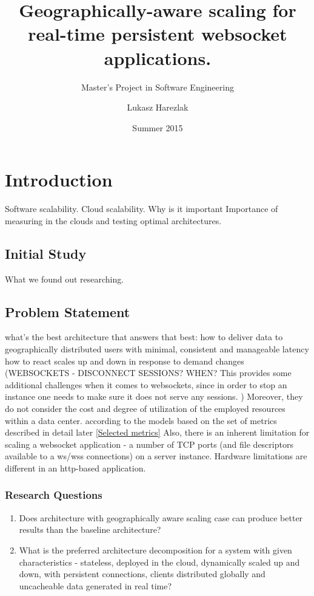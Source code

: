 \documentclass{uvamscse}
\title{Geographically-aware scaling for real-time persistent websocket applications.}
\subtitle{Master's Project in Software Engineering}
\date{Summer 2015}
\author{Lukasz Harezlak}
\begin{document}
\maketitle


\chapter{Introduction}
Software scalability.
Cloud scalability.
Why is it important
Importance of measuring in the clouds and testing optimal architectures.

\section{Initial Study}
What we found out researching.

\section{Problem Statement}
what's the best architecture that answers that best:
how to deliver data to geographically distributed users with minimal, consistent and manageable latency
how to react
scales up and down in response to demand changes (WEBSOCKETS - DISCONNECT SESSIONS? WHEN?  This provides some additional challenges when it comes to websockets, since in order to stop an instance one needs to make sure it does not serve any sessions. \cite{GroBuy})
Moreover, they do not consider the cost and degree of utilization of the employed resources within a data center. \cite{GroBuy}
according to the models based on the set of metrics described in detail later \ref{Selected metrics}
Also, there is an inherent limitation for scaling a websocket application - a number of TCP ports (and file descriptors available to a ws/wss connections) on a server instance. Hardware limitations are different in an http-based application.
\subsection{Research Questions}
\begin{enumerate}
  \item Does architecture with geographically aware scaling case can produce better results than the baseline architecture?
  \item What is the preferred architecture decomposition for a system with given characteristics - stateless, deployed in the cloud, dynamically scaled up and down, with persistent connections, clients distributed globally and uncacheable data generated in real time?
\end{enumerate}
\end{document}
